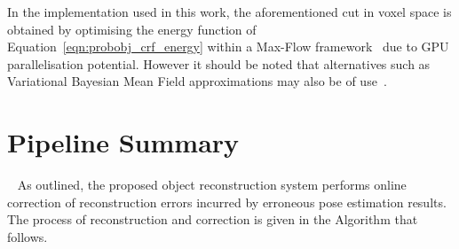 In the implementation used in this work, the aforementioned cut in voxel space
is obtained by optimising the energy function of Equation~\ref{eqn:probobj_crf_energy} 
within a Max-Flow framework~\cite{Boykov2001} due to GPU parallelisation potential. However 
it should be noted that alternatives such as Variational Bayesian Mean Field approximations 
may also be of use~\cite{Krahenbuhl2011}.

\section{Pipeline Summary}
~\label{sec:probobj_pipeline_summary}
As outlined, the proposed object reconstruction system performs online correction of 
reconstruction errors incurred by erroneous pose estimation results. The process of 
reconstruction and correction is given in the Algorithm that follows.

